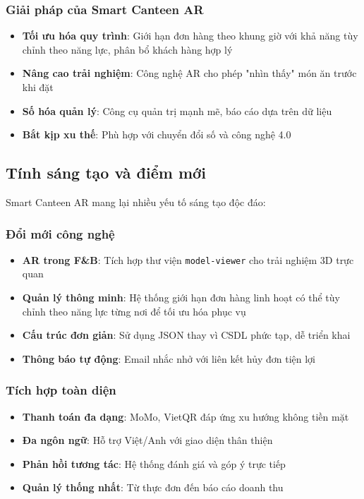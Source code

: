 \documentclass[12pt,a4paper]{article}
\begin{document}
\subsubsection{Giải pháp của Smart Canteen AR}
\begin{itemize}[leftmargin=1cm]
    \item \textbf{Tối ưu hóa quy trình}: Giới hạn đơn hàng theo khung giờ với khả năng tùy chỉnh theo năng lực, phân bổ khách hàng hợp lý
    \item \textbf{Nâng cao trải nghiệm}: Công nghệ AR cho phép "nhìn thấy" món ăn trước khi đặt
    \item \textbf{Số hóa quản lý}: Công cụ quản trị mạnh mẽ, báo cáo dựa trên dữ liệu
    \item \textbf{Bắt kịp xu thế}: Phù hợp với chuyển đổi số và công nghệ 4.0
\end{itemize}

\subsection{Tính sáng tạo và điểm mới}
Smart Canteen AR mang lại nhiều yếu tố sáng tạo độc đáo:

\subsubsection{Đổi mới công nghệ}
\begin{itemize}[leftmargin=1cm]
    \item \textbf{AR trong F\&B}: Tích hợp thư viện \texttt{model-viewer} cho trải nghiệm 3D trực quan
    \item \textbf{Quản lý thông minh}: Hệ thống giới hạn đơn hàng linh hoạt có thể tùy chỉnh theo năng lực từng nơi để tối ưu hóa phục vụ
    \item \textbf{Cấu trúc đơn giản}: Sử dụng JSON thay vì CSDL phức tạp, dễ triển khai
    \item \textbf{Thông báo tự động}: Email nhắc nhở với liên kết hủy đơn tiện lợi
\end{itemize}

\subsubsection{Tích hợp toàn diện}
\begin{itemize}[leftmargin=1cm]
    \item \textbf{Thanh toán đa dạng}: MoMo, VietQR đáp ứng xu hướng không tiền mặt
    \item \textbf{Đa ngôn ngữ}: Hỗ trợ Việt/Anh với giao diện thân thiện
    \item \textbf{Phản hồi tương tác}: Hệ thống đánh giá và góp ý trực tiếp
    \item \textbf{Quản lý thống nhất}: Từ thực đơn đến báo cáo doanh thu
\end{itemize}
\end{document}
